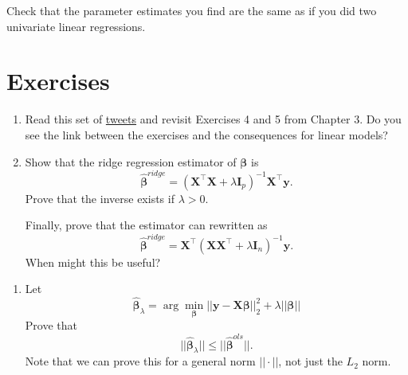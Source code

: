 \documentclass[
]{book}
\providecommand{\tightlist}{%
  \setlength{\itemsep}{0pt}\setlength{\parskip}{0pt}}
\theoremstyle{definition}
\theoremstyle{definition}
\theoremstyle{definition}
\theoremstyle{definition}
\theoremstyle{remark}
\begin{document}
Check that the parameter estimates you find are the same as if you did two univariate linear regressions.

\section{Exercises}\label{exercises-7}

\begin{enumerate}
\def\labelenumi{\arabic{enumi}.}
\setcounter{enumi}{-1}
\item
  Read this set of \href{https://twitter.com/docmilanfar/status/1763454849864413193}{tweets} and revisit Exercises 4 and 5 from Chapter 3. Do you see the link between the exercises and the consequences for linear models?
\item
  Show that the ridge regression estimator of \(\boldsymbol \beta\) is
  \[\hat{\boldsymbol \beta}^{ridge} = (\mathbf X^\top \mathbf X+ \lambda\mathbf I_p)^{-1}\mathbf X^\top \mathbf y.\]
  Prove that the inverse exists if \(\lambda > 0\).

  Finally, prove that the estimator can rewritten as
  \[\hat{\boldsymbol \beta}^{ridge} = \mathbf X^\top(\mathbf X\mathbf X^\top + \lambda\mathbf I_n)^{-1} \mathbf y.\]
  When might this be useful?
\end{enumerate}

\begin{enumerate}
\def\labelenumi{\arabic{enumi}.}
\setcounter{enumi}{1}
\tightlist
\item
  Let
  \[\hat{\boldsymbol \beta}_\lambda=\arg \min_{\boldsymbol \beta} ||\mathbf y-\mathbf X\boldsymbol \beta||_2^2+\lambda ||\boldsymbol \beta||\]
  Prove that \[||\hat{\boldsymbol \beta}_\lambda|| \leq ||\hat{\boldsymbol \beta}^{ols}||.\]
  Note that we can prove this for a general norm \(||\cdot||\), not just the \(L_2\) norm.
\end{enumerate}
\end{document}
